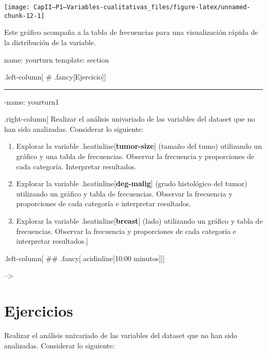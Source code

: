 \documentclass[
]{article}
\begin{document}
\begin{center}\texttt{[image: CapII---P1---Variables-cualitativas\_files/figure-latex/unnamed-chunk-12-1]} \end{center}

Este gráfico acompaña a la tabla de frecuencias para una visualización
rápida de la distribución de la variable.

name: yourturn template: section

.left-column{[} \# .fancy{[}Ejercicio{]}{]}

\begin{center}\rule{0.5\linewidth}{0.5pt}\end{center}

-name: yourturn1

.right-column{[} Realizar el análisis univariado de las variables del
dataset que no han sido analizadas. Considerar lo siguiente:

\begin{enumerate}
\def\labelenumi{\arabic{enumi}.}
\item
  Explorar la variable .heatinline{[}\textbf{tumor-size}{]} (tamaño del
  tumo) utilizando un gráfico y una tabla de frecuencias. Observar la
  frecuencia y proporciones de cada categoría. Interpretar resultados.
\item
  Explorar la variable .heatinline{[}\textbf{deg-malig}{]} (grado
  histológico del tumor) utilizando un gráfico y tabla de frecuencias.
  Observar la frecuencia y proporciones de cada categoría e interpretar
  resultados.
\item
  Explorar la variable .heatinline{[}\textbf{breast}{]} (lado)
  utilizando un gráfico y tabla de frecuencias. Observar la frecuencia y
  proporciones de cada categoría e interpretar resultados.{]}
\end{enumerate}

.left-column{[} \#\# .fancy{[}.acidinline{[}10:00 minutos{]}{]}{]}

--\textgreater{}

\hypertarget{ejercicios}{%
\section{Ejercicios}\label{ejercicios}}

Realizar el análisis univariado de las variables del dataset que no han
sido analizadas. Considerar lo siguiente:
\end{document}
